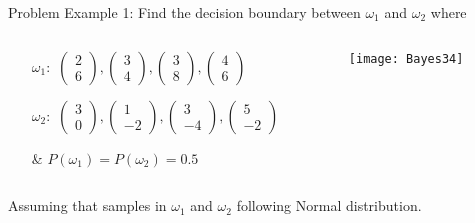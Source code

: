 \begin{frame}{Problem}
Example 1: Find the decision boundary between $\omega_1$ and $\omega_2$ where
\begin{columns}
\begin{column}{5cm}
\begin{footnotesize}
\begin{itemize}
\item [$\omega_1:$] $\left( {\begin{array}{*{20}{c}}
2\\
6
\end{array}} \right),\left( {\begin{array}{*{20}{c}}
3\\
4
\end{array}} \right),\left( {\begin{array}{*{20}{c}}
3\\
8
\end{array}} \right),\left( {\begin{array}{*{20}{c}}
4\\
6
\end{array}} \right)$
\item [$\omega_2:$] $\left( {\begin{array}{*{20}{c}}
3\\
0
\end{array}} \right),\left( {\begin{array}{*{20}{c}}
1\\
-2
\end{array}} \right),\left( {\begin{array}{*{20}{c}}
3\\
-4
\end{array}} \right),\left( {\begin{array}{*{20}{c}}
5\\
-2
\end{array}} \right)$
\item [\&] $P(\omega_1)=P(\omega_2)=0.5$
\end{itemize}
\end{footnotesize}
\end{column}
\begin{column}{5cm}
\begin{figure}
\texttt{[image: Bayes34]}
\end{figure}
\end{column}
\end{columns}
Assuming that samples in $\omega_1$ and $\omega_2$ following Normal distribution.
\end{frame}

